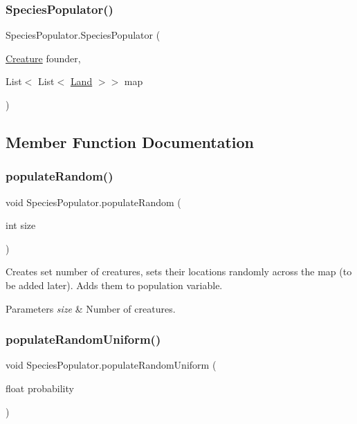 \subsubsection{\texorpdfstring{Species\+Populator()}{SpeciesPopulator()}}
{\footnotesize\ttfamily Species\+Populator.\+Species\+Populator (\begin{DoxyParamCaption}\item[{\mbox{\hyperlink{class_creature}{Creature}}}]{founder,  }\item[{List$<$ List$<$ \mbox{\hyperlink{class_land}{Land}} $>$$>$}]{map }\end{DoxyParamCaption})}



\subsection{Member Function Documentation}
\mbox{\label{class_species_populator_a6d9571023b9d9edd44e28a11e638b001}} 
\subsubsection{\texorpdfstring{populate\+Random()}{populateRandom()}}
{\footnotesize\ttfamily void Species\+Populator.\+populate\+Random (\begin{DoxyParamCaption}\item[{int}]{size }\end{DoxyParamCaption})}



Creates set number of creatures, sets their locations randomly across the map (to be added later). Adds them to population variable. 


\begin{DoxyParams}{Parameters}
{\em size} & Number of creatures.\\
\hline
\end{DoxyParams}
\mbox{\label{class_species_populator_ac76623f1bd486e6981c7f7382ca70f1e}} 
\subsubsection{\texorpdfstring{populate\+Random\+Uniform()}{populateRandomUniform()}}
{\footnotesize\ttfamily void Species\+Populator.\+populate\+Random\+Uniform (\begin{DoxyParamCaption}\item[{float}]{probability }\end{DoxyParamCaption})}



